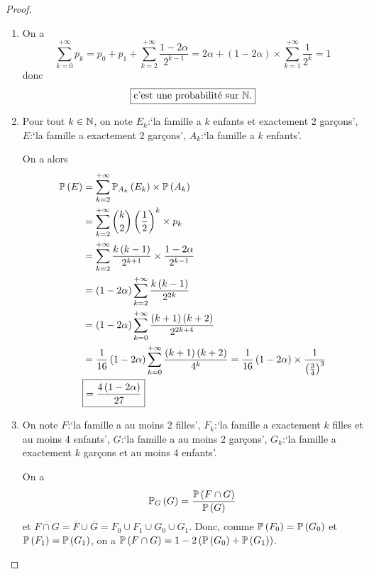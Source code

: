 \begin{proof}
    \phantom{}
    \begin{enumerate}
        \item On a 
        \begin{equation}
            \sum_{k=0}^{+\infty}p_{k}=p_{0}+p_{1}+\sum_{k=2}^{+\infty}\frac{1-2\alpha}{2^{k-1}}=2\alpha+\left(1-2\alpha\right)\times\sum_{k=1}^{+\infty}\frac{1}{2^{k}}=1
        \end{equation}
        donc 
        \begin{equation}
            \boxed{\text{c'est une probabilité sur }\N.}
        \end{equation}

        \item Pour tout $k\in\N$, on note $E_{k}$:`la famille a $k$ enfants et exactement 2 garçons', $E$:`la famille a exactement 2 garçons', $A_{k}$:`la famille a $k$ enfants'.
        
        On a alors 
        \begin{align}
            \P\left(E\right)
            &=\sum_{k=2}^{+\infty}\P_{A_{k}}\left(E_{k}\right)\times\P\left(A_{k}\right)\\
            &=\sum_{k=2}^{+\infty}\binom{k}{2}\left(\frac{1}{2}\right)^{k}\times p_{k}\\
            &=\sum_{k=2}^{+\infty}\frac{k\left(k-1\right)}{2^{k+1}}\times\frac{1-2\alpha}{2^{k-1}}\\
            &=\left(1-2\alpha\right)\sum_{k=2}^{+\infty}\frac{k\left(k-1\right)}{2^{2k}}\\
            &=\left(1-2\alpha\right)\sum_{k=0}^{+\infty}\frac{\left(k+1\right)\left(k+2\right)}{2^{2k+4}}\\
            &=\frac{1}{16}\left(1-2\alpha\right)\sum_{k=0}^{+\infty}\frac{\left(k+1\right)\left(k+2\right)}{4^{k}}=\frac{1}{16}\left(1-2\alpha\right)\times\frac{1}{\left(\frac{3}{4}\right)^{3}}\\
            &\boxed{=\frac{4\left(1-2\alpha\right)}{27}}
        \end{align}

        \item On note $F$:`la famille a au moins 2 filles', $F_{k}$:`la famille a exactement $k$ filles et au moins 4 enfants', $G$:`la famille a au moins 2 garçons', $G_{k}$:`la famille a exactement $k$ garçons et au moins 4 enfants'.
        
        On a 
        \begin{equation}
            \P_{G}\left(G\right)=\frac{\P\left(F\cap G\right)}{\P\left(G\right)}
        \end{equation}
        et $\overline{F\cap G}=\overline{F}\cup\overline{G}=F_{0}\cup F_{1}\cup G_{0}\cup G_{1}$.
        Donc, comme $\P\left(F_{0}\right)=\P\left(G_{0}\right)$ et $\P\left(F_{1}\right)=\P\left(G_{1}\right)$, on a $\P\left(F\cap G\right)=1-2\left(\P\left(G_{0}\right)+\P\left(G_{1}\right)\right)$.


\end{enumerate}
\end{proof}
